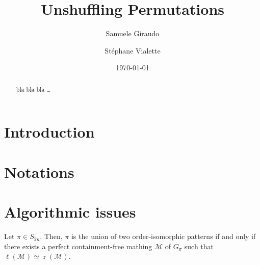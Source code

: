 \documentclass[a4paper,10pt]{llncs}
\DeclareMathOperator{\LEFT}{\ell}
\DeclareMathOperator{\RIGHT}{r}
\begin{document}

\title{%
Unshuffling Permutations}%

\author{%
  Samuele Giraudo \and
  St\'ephane Vialette
}%
\date{\today}

\maketitle


\begin{abstract}
bla bla bla \ldots
\end{abstract}


\section{Introduction}
\label{section:Introduction}



\section{Notations}
\label{section:Notations}



\section{Algorithmic issues}
\label{section:Algorithmic issues}


\begin{proposition}
  \label{proposition:matching}
  Let $\pi \in S_{2n}$.
  Then,
  $\pi$ is the union of two order-isomorphic patterns
  if and only if
  there exists a perfect containment-free mathing
  $\mathcal{M}$ of $G_\pi$ such that
  $\LEFT(\mathcal{M}) \simeq \RIGHT(\mathcal{M})$.
\end{proposition}
\end{document}
